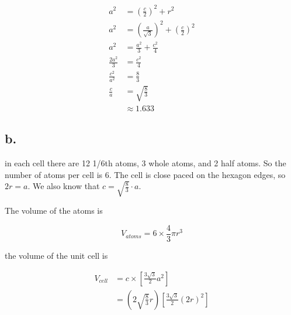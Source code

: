 \documentclass{article}
\begin{document}
\begin{figure}[H]
    \centering
\end{figure}

\begin{align*}
    a^2 &= \left( \frac{c}{2} \right)^2 + r^2 \\
    a^2 &= \left(\frac{a}{\sqrt{3}}\right)^2 + \left(\frac{c}{2}\right)^2 \\
    a^2 &= \frac{a^2}{3} + \frac{c^2}{4} \\
    \frac{2a^2}{3} &= \frac{c^2}{4} \\
    \frac{c^2}{a^2} &= \frac{8}{3} \\
    \frac{c}{a} &= \sqrt{\frac{8}{3}} \\
    &\approx 1.633
\end{align*}

\subsection{b.}

in each cell there are 12 1/6th atoms, 3 whole atoms, and 2 half atoms. So the number of atoms per cell is 6. The cell is close paced on the hexagon edges, so $2r = a$. We also know that $c = \sqrt{\frac{8}{3}} \cdot a$. 

The volume of the atoms is 

\[
    V_{atoms} = 6 \times \frac{4}{3} \pi r^3
\]

the volume of the unit cell is 

\begin{align*}
    V_{cell} &= c \times \left[ \frac{3\sqrt{3}}{2} a^2 \right] \\
    &= \left( 2 \sqrt{\frac{8}{3}} r \right)\left[ \frac{3\sqrt{3}}{2} (2r)^2 \right]
\end{align*}
\end{document}
